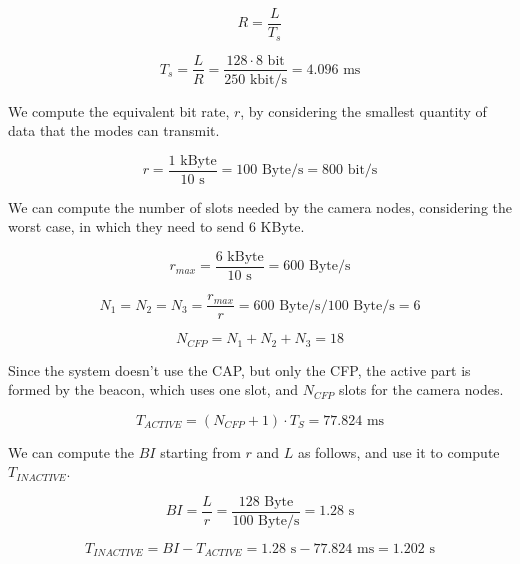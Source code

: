 \begin{equation}
R = \frac{L}{T_{s}}
\end{equation}

\begin{equation}
T_{s} = \frac{L}{R} = \frac{128 \cdot 8\text{ bit}}{250\text{ kbit/s}} = 4.096\text{ ms}
\end{equation}

We compute the equivalent bit rate, $r$,  by considering the smallest quantity of data that the modes can transmit. 

\begin{equation}
r = \frac{1 \text{ kByte}}{10 \text{ s}} = 100 \text{ Byte/s} = 800 \text{ bit/s}
\end{equation}

We can compute the number of slots needed by the camera nodes, considering the worst case, in which they need to send 6 KByte.

\begin{equation}
r_{max} = \frac{6 \text{ kByte}}{10 \text{ s}} = 600 \text{ Byte/s}
\end{equation}

\begin{equation}
N_{1} = N_{2} = N_{3} = \frac{r_{max}}{r} = 600 \text{ Byte/s} / 100 \text{ Byte/s} = 6
\end{equation}

\begin{equation}
N_{CFP} = N_1 + N_2 + N_3 = 18
\end{equation}

Since the system doesn't use the CAP, but only the CFP, the active part is formed by the beacon, which uses one slot, and $N_{CFP}$ slots for the camera nodes.

\begin{equation}
T_{ACTIVE} = (N_{CFP} + 1) \cdot T_S = 77.824 \text{ ms}
\end{equation}

We can compute the $BI$ starting from $r$ and $L$ as follows, and use it to compute $T_{INACTIVE}$.

\begin{equation}
BI = \frac{L}{r} = \frac{128 \text{ Byte}}{100 \text{ Byte/s}} = 1.28 \text{ s}
\end{equation}

\begin{equation}
T_{INACTIVE} = BI - T_{ACTIVE} = 1.28\text{ s} - 77.824 \text{ ms} = 1.202\text{ s}
\end{equation}

